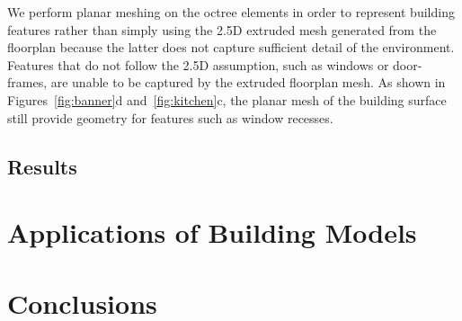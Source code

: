 \documentclass[12pt,onecolumn,oneside]{book}
\begin{document}
We perform planar meshing on the octree elements in order to represent building features rather than simply using the 2.5D extruded mesh generated from the floorplan because the latter does not capture sufficient detail of the environment.  Features that do not follow the 2.5D assumption, such as windows or door-frames, are unable to be captured by the extruded floorplan mesh.  As shown in Figures~\ref{fig:banner}d and~\ref{fig:kitchen}c, the planar mesh of the building surface still provide geometry for features such as window recesses.

\section{Results}
\label{sec:procarve_results}



\chapter{Applications of Building Models}
\label{ch:applications}



\chapter{Conclusions}
\label{ch:conclusion}





%

\vfill

\end{document}
